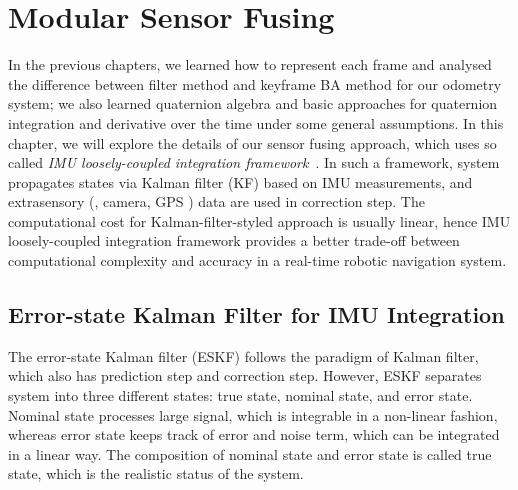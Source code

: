\chapter{Modular Sensor Fusing}
\label{chap:sensor_fusing}

In the previous chapters, we learned how to represent each frame and analysed the difference between filter method and keyframe BA method for our odometry system; we also learned quaternion algebra and basic approaches for quaternion integration and derivative over the time under some general assumptions. In this chapter, we will explore the details of our sensor fusing approach, which uses so called \textit{IMU loosely-coupled integration framework}~\cite{weiss2012vision}. In such a framework, system propagates states via Kalman filter (KF) based on IMU measurements, and extrasensory (\eg, camera, GPS \etc) data are used in correction step. The computational cost for Kalman-filter-styled approach is usually linear, hence IMU loosely-coupled integration framework provides a better trade-off between computational complexity and accuracy in a real-time robotic navigation system.

\section{Error-state Kalman Filter for IMU Integration}
\label{sec:ESKF_IMU}

The error-state Kalman filter (ESKF) follows the paradigm of Kalman filter, which also has prediction step and correction step. However, ESKF separates system into three different states: true state, nominal state, and error state. Nominal state processes large signal, which is integrable in a non-linear fashion, whereas error state keeps track of error and noise term, which can be integrated in a linear way. The composition of nominal state and error state is called true state, which is the realistic status of the system.

